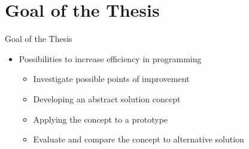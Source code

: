 \documentclass{beamer}
\begin{document}
\begin{frame}[plain]
  \titlepage{}
\end{frame}

\begin{frame}[allowframebreaks]{}
  \tableofcontents
\end{frame}

\section{Goal of the Thesis}
\begin{frame}{Goal of the Thesis}
  \begin{itemize}
    \large
    \setlength\itemsep{1em}
    \setlength{\parskip}{12pt}
    \item Possibilities to increase efficiency in programming
          \begin{itemize}
            \large
            \setlength\itemsep{1em}
            \item Investigate possible points of improvement
            \item Developing an abstract solution concept
            \item Applying the concept to a prototype
            \item Evaluate and compare the concept to alternative solution
          \end{itemize}
  \end{itemize}
  \vfill
\end{frame}


\end{document}
